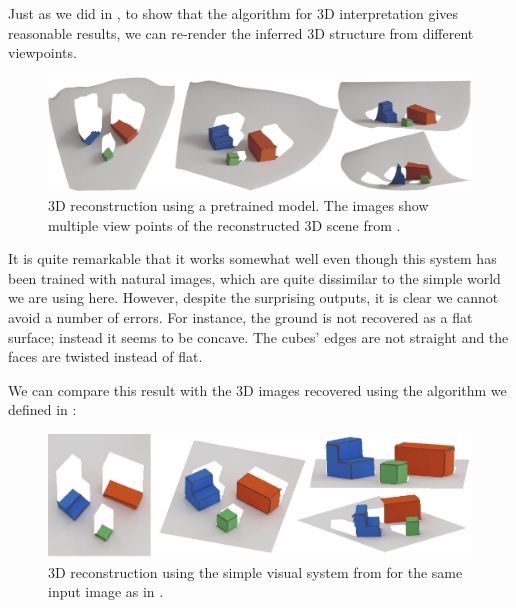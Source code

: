 Just as we did in \chap{\ref{chapter:simplesystem}}, to show that the algorithm for 3D interpretation gives reasonable results, we can re-render the inferred 3D structure from different viewpoints. 
\begin{figure}
\centerline{
\includegraphics[width=1\linewidth]{figures/simplesystem_revisited/views_midas.jpg}
} 
\caption{3D reconstruction using a pretrained model. The images show multiple view points of the reconstructed 3D scene from \fig{\ref{fig:simplesystem_revisited_img1}}.} 
\label{fig:views_midas}
\end{figure}

It is quite remarkable that it works somewhat well even though this system has been trained with natural images, which are quite dissimilar to the simple world we are using here. However, despite the surprising outputs, it is clear we cannot avoid a number of errors. For instance, the ground is not recovered as a flat surface; instead it seems to be concave. The cubes' edges are not straight and the faces are twisted instead of flat.  

We can compare this result with the 3D images recovered using the algorithm we defined in \chap{\ref{chapter:simplesystem}}:
\begin{figure}
\centerline{
\includegraphics[width=1\linewidth]{figures/simplesystem/views.pdf}
} 
\caption{3D reconstruction using the simple visual system from \chap{\ref{chapter:simplesystem}} for the same input image as in \fig{\ref{fig:views_midas}}.} 
\end{figure}

